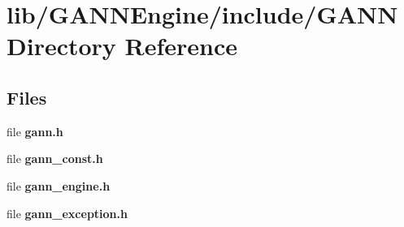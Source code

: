 \section{lib/\+G\+A\+N\+N\+Engine/include/\+G\+A\+N\+N Directory Reference}
\label{dir_601f8915fbb8e1468a6f75e10acf55ac}
\subsection*{Files}
\begin{DoxyCompactItemize}
\item 
file {\bfseries gann.\+h}
\item 
file {\bfseries gann\+\_\+const.\+h}
\item 
file {\bfseries gann\+\_\+engine.\+h}
\item 
file {\bfseries gann\+\_\+exception.\+h}
\end{DoxyCompactItemize}

